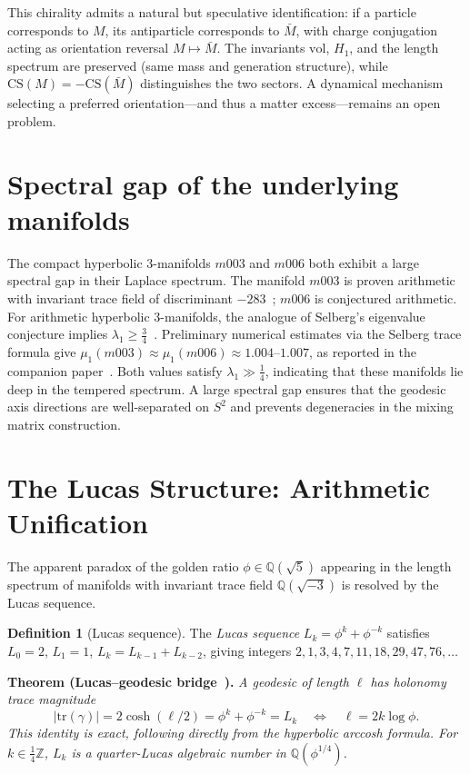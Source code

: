﻿\documentclass[12pt]{article}
\theoremstyle{definition}
\newtheorem{definition}[theorem]{Definition}
\begin{document}
This chirality admits a natural but speculative identification: if a
particle corresponds to $M$, its antiparticle corresponds to $\bar{M}$,
with charge conjugation acting as orientation reversal
$M\mapsto\bar{M}$. The invariants $\mathrm{vol}$, $H_1$, and the
length spectrum are preserved (same mass and generation structure),
while $\mathrm{CS}(M) = -\mathrm{CS}(\bar{M})$ distinguishes the two
sectors. A dynamical mechanism selecting a preferred orientation---and
thus a matter excess---remains an open problem.

\section{Spectral gap of the underlying manifolds}
\label{sec:spectral}

The compact hyperbolic 3-manifolds $m003$ and $m006$ both exhibit a
large spectral gap in their Laplace spectrum.
The manifold $m003$ is proven arithmetic with invariant trace field
of discriminant $-283$~\cite{Chinburg98}; $m006$ is conjectured arithmetic.
For arithmetic hyperbolic 3-manifolds, the analogue of Selberg's
eigenvalue conjecture implies $\lambda_1 \geq \tfrac{3}{4}$~\cite{Sarnak}.
Preliminary numerical estimates via the Selberg trace formula give
$\mu_1(m003) \approx \mu_1(m006) \approx 1.004$--$1.007$,
as reported in the companion paper~\cite{Gentry:Twist}.
Both values satisfy $\lambda_1 \gg \tfrac{1}{4}$, indicating that
these manifolds lie deep in the tempered spectrum.
A large spectral gap ensures that the geodesic axis directions are
well-separated on $S^2$ and prevents degeneracies in the mixing
matrix construction.


\section{The Lucas Structure: Arithmetic Unification}
\label{sec:lucas}

The apparent paradox of the golden ratio $\phi \in \mathbb{Q}(\sqrt{5})$
appearing in the length spectrum of manifolds with invariant trace field
$\mathbb{Q}(\sqrt{-3})$ is resolved by the Lucas sequence.

\begin{definition}[Lucas sequence]
The \emph{Lucas sequence} $L_k = \phi^k + \phi^{-k}$ satisfies
$L_0=2$, $L_1=1$, $L_k = L_{k-1}+L_{k-2}$, giving integers
$2,1,3,4,7,11,18,29,47,76,\ldots$
\end{definition}

\noindent\textbf{Theorem (Lucas--geodesic bridge~\cite{Gentry:Lucas}).}
\emph{A geodesic of length $\ell$ has holonomy trace magnitude}
\begin{equation}
  |\mathrm{tr}(\gamma)| = 2\cosh(\ell/2)
  = \phi^k + \phi^{-k} = L_k
  \quad\Longleftrightarrow\quad \ell = 2k\log\phi.
  \label{eq:lucas-bridge}
\end{equation}
\emph{This identity is exact, following directly from the hyperbolic
arccosh formula. For $k\in\tfrac{1}{4}\mathbb{Z}$, $L_k$ is a
quarter-Lucas algebraic number in $\mathbb{Q}(\phi^{1/4})$.}
\end{document}
